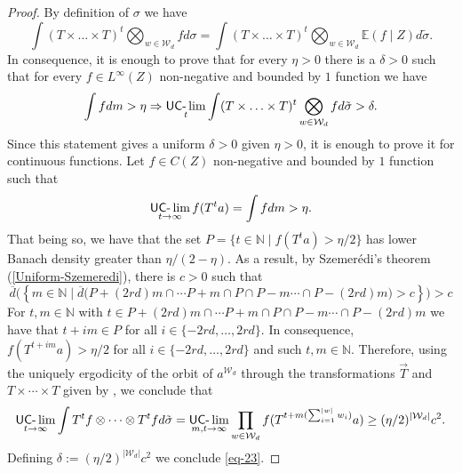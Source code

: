 \documentclass[letter,11pt]{article}
\theoremstyle{definition}
\newcommand{\N}{\mathbb{N}}
\newcommand{\E}{\mathbb{E}}
\newcommand{\uclim}{\mathop{\textup{\textsf{UC-}}\lim}}
\begin{document}
\begin{proof}
  By definition of $\sigma$ we have
\begin{equation*}
  \int (T\times\ldots \times T)^t\bigotimes_{w\in \mathcal{W}_d} f d\sigma= \int (T\times\ldots \times T)^t\bigotimes_{w\in \mathcal{W}_d} \E(f \mid Z) d\tilde{\sigma}. 
\end{equation*}
In consequence, it is enough to prove that for every $\eta>0$ there is a $\delta>0$ such that for every $f\in L^\infty(Z)$ non-negative and bounded by $1$ function we have 
\begin{equation}\label{eq-23}
   \int f dm > \eta \Rightarrow \uclim_{t} \int (T\times\ldots \times T)^t\bigotimes_{w\in \mathcal{W}_d} f d\tilde{\sigma}>\delta.
\end{equation}
Since this statement gives a uniform $\delta>0$ given $\eta>0$, it is enough to prove it for continuous functions. Let $f\in C(Z)$ non-negative and bounded by $1$ function such that
\begin{equation*}
   \uclim_{t\to\infty} f(T^ta) = \int f dm > \eta.
\end{equation*}
That being so, we have that the set $
    P=\{t\in \N \mid f(T^ta)>\eta/2\}$ has lower Banach density greater than $\eta/(2-\eta)$. As a result, by Szemerédi's theorem (\cref{Uniform-Szemeredi}), there is $c>0$ such that
\begin{equation*}
    \overline{d}\Big(\left\{ m\in \N\mid  \overline{d}\Big( P+(2rd)m\cap\cdots P+m\cap P \cap P-m \cdots \cap P-(2rd)m \Big)      >c    \right\}  \Big)>c
\end{equation*}
For $t,m\in \N$ with $t\in  P+(2rd)m\cap\cdots P+m\cap P \cap P-m \cdots \cap P-(2rd)m$ we have that $t+im\in P$ for all $i\in \{-2rd,\ldots,2rd\}$. In consequence, $f(T^{t+im}a)>\eta/2$ for all $i\in  \{-2rd,\ldots,2rd\}$ and such $t,m\in \N$. Therefore, using the uniquely ergodicity of the orbit of $a^{\mathcal{W}_d}$ through the transformations $\Vec{T}$ and $T\times\cdots\times T$ given by \cite[Theorem 17, Chapter 11]{Host_Kra_nilpotent_structures_ergodic_theory:2018}, we conclude that
\begin{equation*}
    \uclim_{t\to \infty}  \int T^tf\otimes\cdots \otimes T^tf d\tilde{\sigma}= \uclim_{m,t\to\infty} \prod_{w\in \mathcal{W}_d} f(T^{t+m(\sum_{i=1}^{|w|} w_i )}a)\geq (\eta/2)^{|\mathcal{W}_d|} c^2.
\end{equation*}
Defining $\delta:=  (\eta/2)^{|\mathcal{W}_d|} c^2$ we conclude \cref{eq-23}. 
\end{proof}
\end{document}
